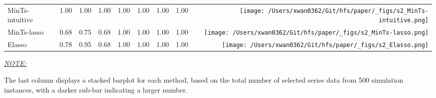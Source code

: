 \documentclass[11pt,a4paper,]{article}
\begin{document}
\begin{table}[!h]
{\begin{threeparttable}
\begin{tabular}{llrrrrrr>{}r}
MinTs-intuitive & 1.00 & 1.00 & 1.00 & 1.00 & 1.00 & 1.00 & 1.00 & \texttt{[image: /Users/xwan0362/Git/hfs/paper/\_figs/s2\_MinTs-intuitive.png]}\\
MinTs-lasso & 0.68 & 0.75 & 0.68 & 1.00 & 1.00 & 1.00 & 1.00 & \texttt{[image: /Users/xwan0362/Git/hfs/paper/\_figs/s2\_MinTs-lasso.png]}\\
\midrule
Elasso & 0.78 & 0.95 & 0.68 & 1.00 & 1.00 & 1.00 & 1.00 & \texttt{[image: /Users/xwan0362/Git/hfs/paper/\_figs/s2\_Elasso.png]}\\
\bottomrule
\end{tabular}
\begin{tablenotes}[para]
\item \underline{\textit{NOTE:}} 
\item The last column displays a stacked barplot for each method, based on the total number of selected series data from 500 simulation instances, with a darker sub-bar indicating a larger number.
\end{tablenotes}
\end{threeparttable}}
\endgroup{}
\end{table}
\end{document}
